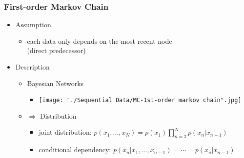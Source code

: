 \subsubsection{First-order Markov Chain}
\begin{itemize}
\item Assumption
	\begin{itemize}
	\item each data only depends on the most recent node \\
	(direct predecessor)
	\end{itemize}
\item Description
	\begin{itemize}
	\item Bayesian Networks 
		\begin{itemize}
		\item \texttt{[image: "./Sequential Data/MC-1st-order markov chain".jpg]}
		\end{itemize}
	\item $\Rightarrow$ Distribution
		\begin{itemize}
		\item joint distribution: $\displaystyle p(x_1,...,x_N) = p(x_1) \prod_{n=2}^N p(x_n|x_{n-1})$
		\item conditional dependency: $p(x_n|x_1,...,x_{n-1}) = \cdots = p(x_n|x_{n-1})$
		\end{itemize}
	\end{itemize}
\end{itemize}

